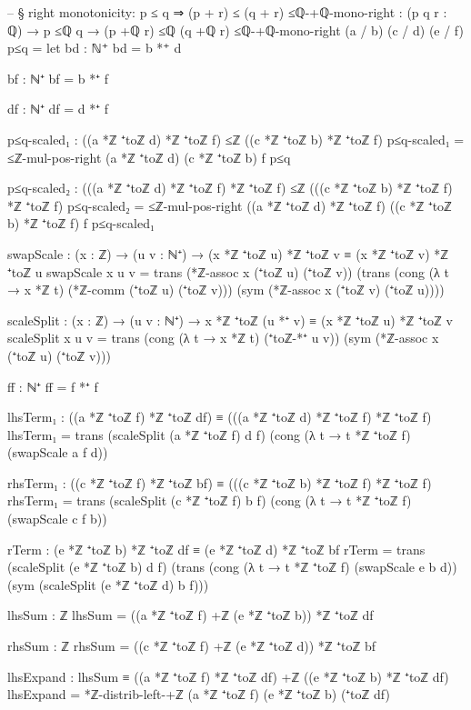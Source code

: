 \documentclass[11pt,a4paper]{book}
\begin{document}
\begin{code}
-- § right monotonicity: p ≤ q ⇒ (p + r) ≤ (q + r)
≤ℚ-+ℚ-mono-right : (p q r : ℚ) → p ≤ℚ q → (p +ℚ r) ≤ℚ (q +ℚ r)
≤ℚ-+ℚ-mono-right (a / b) (c / d) (e / f) p≤q =
  let
    bd : ℕ⁺
    bd = b *⁺ d

    bf : ℕ⁺
    bf = b *⁺ f

    df : ℕ⁺
    df = d *⁺ f

    p≤q-scaled₁ : ((a *ℤ ⁺toℤ d) *ℤ ⁺toℤ f) ≤ℤ ((c *ℤ ⁺toℤ b) *ℤ ⁺toℤ f)
    p≤q-scaled₁ = ≤ℤ-mul-pos-right (a *ℤ ⁺toℤ d) (c *ℤ ⁺toℤ b) f p≤q

    p≤q-scaled₂ : (((a *ℤ ⁺toℤ d) *ℤ ⁺toℤ f) *ℤ ⁺toℤ f) ≤ℤ (((c *ℤ ⁺toℤ b) *ℤ ⁺toℤ f) *ℤ ⁺toℤ f)
    p≤q-scaled₂ = ≤ℤ-mul-pos-right ((a *ℤ ⁺toℤ d) *ℤ ⁺toℤ f) ((c *ℤ ⁺toℤ b) *ℤ ⁺toℤ f) f p≤q-scaled₁

    swapScale : (x : ℤ) → (u v : ℕ⁺) → (x *ℤ ⁺toℤ u) *ℤ ⁺toℤ v ≡ (x *ℤ ⁺toℤ v) *ℤ ⁺toℤ u
    swapScale x u v =
      trans
        (*ℤ-assoc x (⁺toℤ u) (⁺toℤ v))
        (trans
          (cong (λ t → x *ℤ t) (*ℤ-comm (⁺toℤ u) (⁺toℤ v)))
          (sym (*ℤ-assoc x (⁺toℤ v) (⁺toℤ u))))

    scaleSplit : (x : ℤ) → (u v : ℕ⁺) → x *ℤ ⁺toℤ (u *⁺ v) ≡ (x *ℤ ⁺toℤ u) *ℤ ⁺toℤ v
    scaleSplit x u v =
      trans
        (cong (λ t → x *ℤ t) (⁺toℤ-*⁺ u v))
        (sym (*ℤ-assoc x (⁺toℤ u) (⁺toℤ v)))

    ff : ℕ⁺
    ff = f *⁺ f

    lhsTerm₁ : ((a *ℤ ⁺toℤ f) *ℤ ⁺toℤ df) ≡ (((a *ℤ ⁺toℤ d) *ℤ ⁺toℤ f) *ℤ ⁺toℤ f)
    lhsTerm₁ =
      trans
        (scaleSplit (a *ℤ ⁺toℤ f) d f)
        (cong (λ t → t *ℤ ⁺toℤ f) (swapScale a f d))

    rhsTerm₁ : ((c *ℤ ⁺toℤ f) *ℤ ⁺toℤ bf) ≡ (((c *ℤ ⁺toℤ b) *ℤ ⁺toℤ f) *ℤ ⁺toℤ f)
    rhsTerm₁ =
      trans
        (scaleSplit (c *ℤ ⁺toℤ f) b f)
        (cong (λ t → t *ℤ ⁺toℤ f) (swapScale c f b))

    rTerm : (e *ℤ ⁺toℤ b) *ℤ ⁺toℤ df ≡ (e *ℤ ⁺toℤ d) *ℤ ⁺toℤ bf
    rTerm =
      trans
        (scaleSplit (e *ℤ ⁺toℤ b) d f)
        (trans
          (cong (λ t → t *ℤ ⁺toℤ f) (swapScale e b d))
          (sym (scaleSplit (e *ℤ ⁺toℤ d) b f)))

    lhsSum : ℤ
    lhsSum = ((a *ℤ ⁺toℤ f) +ℤ (e *ℤ ⁺toℤ b)) *ℤ ⁺toℤ df

    rhsSum : ℤ
    rhsSum = ((c *ℤ ⁺toℤ f) +ℤ (e *ℤ ⁺toℤ d)) *ℤ ⁺toℤ bf

    lhsExpand : lhsSum ≡ ((a *ℤ ⁺toℤ f) *ℤ ⁺toℤ df) +ℤ ((e *ℤ ⁺toℤ b) *ℤ ⁺toℤ df)
    lhsExpand = *ℤ-distrib-left-+ℤ (a *ℤ ⁺toℤ f) (e *ℤ ⁺toℤ b) (⁺toℤ df)


\end{code}
\end{document}
